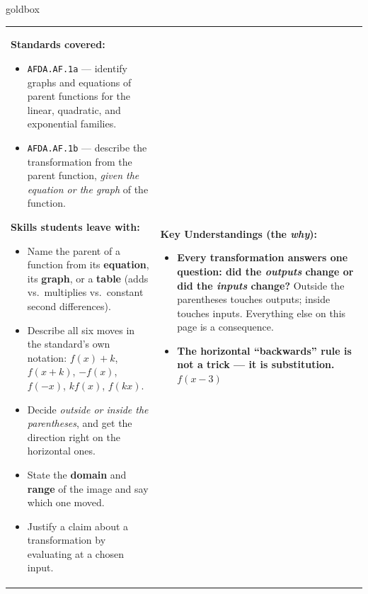\documentclass[10pt]{article}
\begin{document}
\renewcommand{\arraystretch}{1.6}
\begin{skillbox}{goldbox}
\begin{tabularx}{\linewidth}{@{}X|X@{}}
\begin{minipage}[t]{\linewidth}\vspace{0pt}
\textbf{Standards covered:}
\begin{itemize}[leftmargin=1.1em, itemsep=2pt, topsep=2pt]
  \item \texttt{AFDA.AF.1a} --- identify graphs and equations of parent functions for the linear,
        quadratic, and exponential families.
  \item \texttt{AFDA.AF.1b} --- describe the transformation from the parent function, \emph{given
        the equation or the graph} of the function.
\end{itemize}
\textbf{Skills students leave with:}
\begin{itemize}[leftmargin=1.1em, itemsep=2pt, topsep=2pt]
  \item Name the parent of a function from its \textbf{equation}, its \textbf{graph}, or a
        \textbf{table} (adds vs.\ multiplies vs.\ constant second differences).
  \item Describe all six moves in the standard's own notation: $f(x)+k$, $f(x+k)$, $-f(x)$,
        $f(-x)$, $k f(x)$, $f(kx)$.
  \item Decide \emph{outside or inside the parentheses}, and get the direction right on the
        horizontal ones.
  \item State the \textbf{domain} and \textbf{range} of the image and say which one moved.
  \item Justify a claim about a transformation by evaluating at a chosen input.
\end{itemize}
\end{minipage}
&
\begin{minipage}[t]{\linewidth}\vspace{0pt}
\textbf{Key Understandings (the \emph{why}):}
\begin{itemize}[leftmargin=1.1em, itemsep=2pt, topsep=2pt]
  \item \textbf{Every transformation answers one question: did the \emph{outputs} change or did the
        \emph{inputs} change?} Outside the parentheses touches outputs; inside touches inputs.
        Everything else on this page is a consequence.
  \item \textbf{The horizontal ``backwards'' rule is not a trick --- it is substitution.} $f(x-3)$

\end{itemize}
\end{minipage}
\end{tabularx}
\end{skillbox}
\end{document}
